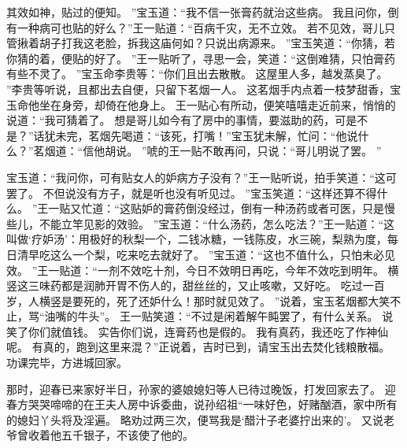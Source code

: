 其效如神，贴过的便知。
”宝玉道：“我不信一张膏药就治这些病。
我且问你，倒有一种病可也贴的好么？”王一贴道：“百病千灾，无不立效。
若不见效，哥儿只管揪着胡子打我这老脸，拆我这庙何如？只说出病源来。
”宝玉笑道：“你猜，若你猜的着，便贴的好了。
”王一贴听了，寻思一会，笑道：“这倒难猜，只怕膏药有些不灵了。
”宝玉命李贵等：“你们且出去散散。
这屋里人多，越发蒸臭了。
”李贵等听说，且都出去自便，只留下茗烟一人。
这茗烟手内点着一枝梦甜香，宝玉命他坐在身旁，却倚在他身上。
王一贴心有所动，便笑嘻嘻走近前来，悄悄的说道：“我可猜着了。
想是哥儿如今有了房中的事情，要滋助的药，可是不是？”话犹未完，茗烟先喝道：“该死，打嘴！”宝玉犹未解，忙问：“他说什么？”茗烟道：“信他胡说。
”唬的王一贴不敢再问，只说：“哥儿明说了罢。
”\par
宝玉道：“我问你，可有贴女人的妒病方子没有？”王一贴听说，拍手笑道：“这可罢了。
不但说没有方子，就是听也没有听见过。
”宝玉笑道：“这样还算不得什么。
”王一贴又忙道：“这贴妒的膏药倒没经过，倒有一种汤药或者可医，只是慢些儿，不能立竿见影的效验。
”宝玉道：“什么汤药，怎么吃法？”王一贴道：“这叫做‘疗妒汤’：用极好的秋梨一个，二钱冰糖，一钱陈皮，水三碗，梨熟为度，每日清早吃这么一个梨，吃来吃去就好了。
”宝玉道：“这也不值什么，只怕未必见效。
”王一贴道：“一剂不效吃十剂，今日不效明日再吃，今年不效吃到明年。
横竖这三味药都是润肺开胃不伤人的，甜丝丝的，又止咳嗽，又好吃。
吃过一百岁，人横竖是要死的，死了还妒什么！那时就见效了。
”说着，宝玉茗烟都大笑不止，骂“油嘴的牛头”。
王一贴笑道：“不过是闲着解午盹罢了，有什么关系。
说笑了你们就值钱。
实告你们说，连膏药也是假的。
我有真药，我还吃了作神仙呢。
有真的，跑到这里来混？”正说着，吉时已到，请宝玉出去焚化钱粮散福。
功课完毕，方进城回家。
\par
那时，迎春已来家好半日，孙家的婆娘媳妇等人已待过晚饭，打发回家去了。
迎春方哭哭啼啼的在王夫人房中诉委曲，说孙绍祖“一味好色，好赌酗酒，家中所有的媳妇丫头将及淫遍。
略劝过两三次，便骂我是‘醋汁子老婆拧出来的’。
又说老爷曾收着他五千银子，不该使了他的。
